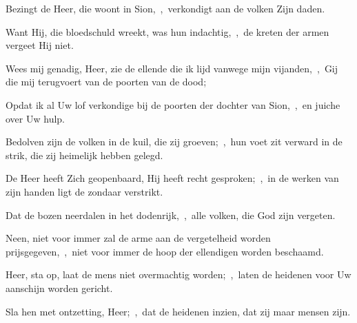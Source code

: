 \documentclass[12pt,twoside,a5paper]{article}
\begin{document}
\begin{halfparskip}
  Bezingt de Heer, die woont in Sion,~\sep\ verkondigt aan de volken Zijn daden.

  Want Hij, die bloedschuld wreekt, was hun indachtig,~\sep\ de kreten der armen vergeet Hij niet.

  Wees mij genadig, Heer, zie de ellende die ik lijd vanwege mijn vijanden,~\sep\ Gij die mij terugvoert van de poorten van de dood;

  Opdat ik al Uw lof verkondige bij de poorten der dochter van Sion,~\sep\ en juiche over Uw hulp.

  Bedolven zijn de volken in de kuil, die zij groeven;~\sep\ hun voet zit verward in de strik, die zij heimelijk hebben gelegd.

  De Heer heeft Zich geopenbaard, Hij heeft recht gesproken;~\sep\ in de werken van zijn handen ligt de zondaar verstrikt.

  Dat de bozen neerdalen in het dodenrijk,~\sep\ alle volken, die God zijn vergeten.

  Neen, niet voor immer zal de arme aan de vergetelheid worden prijsgegeven,~\sep\ niet voor immer de hoop der ellendigen worden beschaamd.

  Heer, sta op, laat de mens niet overmachtig worden;~\sep\ laten de heidenen voor Uw aanschijn worden gericht.

  Sla hen met ontzetting, Heer;~\sep\ dat de heidenen inzien, dat zij maar mensen zijn.
\end{halfparskip}


\end{document}
